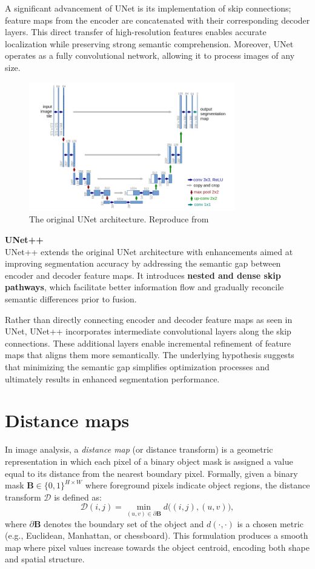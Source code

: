 \documentclass[target=bach,aauheader=,style=]{thud}
\begin{document}
A significant advancement of UNet is its implementation of skip connections; feature maps from the encoder are concatenated with their corresponding decoder layers. This direct transfer of high-resolution features enables accurate localization while preserving strong semantic comprehension. Moreover, UNet operates as a fully convolutional network, allowing it to process images of any size.
\begin{figure}[H]
  \centering
  \includegraphics[width=0.8\textwidth]{imgs/unet.png}
  \caption{The original UNet architecture. Reproduce from \cite{DBLP:journals/corr/RonnebergerFB15}}
  \label{fig:unet}
\end{figure}
\noindent\textbf{UNet++}\\

\noindent UNet++ \cite{DBLP:journals/corr/abs-1807-10165} extends the original UNet architecture with enhancements aimed at improving segmentation accuracy by addressing the semantic gap between encoder and decoder feature maps. It introduces \textbf{nested and dense skip pathways}, which facilitate better information flow and gradually reconcile semantic differences prior to fusion.

Rather than directly connecting encoder and decoder feature maps as seen in UNet, UNet++ incorporates intermediate convolutional layers along the skip connections. These additional layers enable incremental refinement of feature maps that aligns them more semantically. The underlying hypothesis suggests that minimizing the semantic gap simplifies optimization processes and ultimately results in enhanced segmentation performance.
\section{Distance maps}
In image analysis, a \emph{distance map} (or distance transform) is a geometric representation in which each pixel of a binary object mask is assigned a value equal to its distance from the nearest boundary pixel. 
Formally, given a binary mask $\mathbf{B}\in\{0,1\}^{H\times W}$ where foreground pixels indicate object regions, the distance transform $\mathcal{D}$ is defined as:
\[
\mathcal{D}(i,j) = \min_{(u,v)\in \partial \mathbf{B}} d\big((i,j),(u,v)\big),
\]
where $\partial \mathbf{B}$ denotes the boundary set of the object and $d(\cdot,\cdot)$ is a chosen metric (e.g., Euclidean, Manhattan, or chessboard). 
This formulation produces a smooth map where pixel values increase towards the object centroid, encoding both shape and spatial structure.
\end{document}

